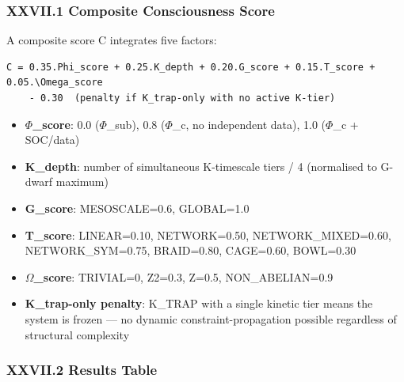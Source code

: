 \documentclass[12pt,a4paper]{article}
\begin{document}
\subsubsection{XXVII.1 Composite Consciousness Score}

A composite score C integrates five factors:

\begin{lstlisting}
C = 0.35.Phi_score + 0.25.K_depth + 0.20.G_score + 0.15.T_score + 0.05.\Omega_score
    - 0.30  (penalty if K_trap-only with no active K-tier)
\end{lstlisting}

\begin{itemize}
    \item \textbf{$\Phi$\_score}: 0.0 ($\Phi$\_sub), 0.8 ($\Phi$\_c, no independent data), 1.0 ($\Phi$\_c + SOC/\xi data)
    \item \textbf{K\_depth}: number of simultaneous K-timescale tiers / 4 (normalised to G-dwarf maximum)
    \item \textbf{G\_score}: MESOSCALE=0.6, GLOBAL=1.0
    \item \textbf{T\_score}: LINEAR=0.10, NETWORK=0.50, NETWORK\_MIXED=0.60, NETWORK\_SYM=0.75, BRAID=0.80, CAGE=0.60, BOWL=0.30
    \item \textbf{$\Omega$\_score}: TRIVIAL=0, Z2=0.3, Z=0.5, NON\_ABELIAN=0.9
    \item \textbf{K\_trap-only penalty}: K\_TRAP with a single kinetic tier means the system is frozen --- no dynamic constraint-propagation possible regardless of structural complexity
\end{itemize}

\subsubsection{XXVII.2 Results Table}
\end{document}
